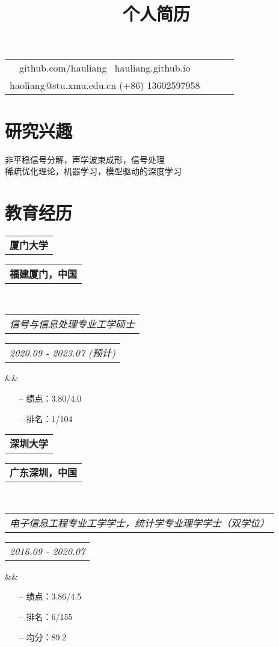 \documentclass[11pt,a4paper,roman]{moderncv}        %
\title{个人简历}
\makeatletter
\newcommand*{\customcventry}[7][.25em]{
	\begin{tabular}{@{}l} 
		{\bfseries #4}
	\end{tabular}
	\hfill%
	\begin{tabular}{l@{}}
		{\bfseries #5}
	\end{tabular} \\
	\begin{tabular}{@{}l} 
		{\itshape #3}
	\end{tabular}
	\hfill%
	\begin{tabular}{l@{}}
		{\itshape #2}
	\end{tabular}
	\ifx&#7&%
	\else{\\%
		\begin{minipage}{\maincolumnwidth}%
			\small#7%
	\end{minipage}}\fi%
	\par\addvspace{#1}}
\makeatother
\begin{document}
	\makecvtitle
	\vspace*{-16mm}
	
	\begin{center}
		\renewcommand{\arraystretch}{1.3}
		\begin{tabular}{ c c c c }
			\faGithub\enspace github.com/hauliang \  \enspace \faGlobe\enspace hauliang.github.io  \\
			\faEnvelopeO\enspace haoliang@stu.xmu.edu.cn \enspace  \enspace \faMobile\enspace (+86) 13602597958 \\
		\end{tabular}
	\end{center}
	
	\vspace*{-2.5mm}
	

	\cfoot{\vspace{-2mm}{\color{gray} \rule[-10pt]{14.3cm}{0.05em}} \vspace{2mm}\\ \textcolor{gray}{最后更新时间：2022/08/05}}
	
	\section{研究兴趣}
	非平稳信号分解，声学波束成形，信号处理 \\
	稀疏优化理论，机器学习，模型驱动的深度学习
	
	\section{教育经历}
	{\customcventry{2020.09 - 2023.07 (预计)}{信号与信息处理专业工学硕士 }{厦门大学}{福建厦门，中国}{}{}}
	
	\begin{itemize}
		\item[--] 绩点：3.80/4.0  
		\item[--] 排名：1/104 
	\end{itemize}
	\vspace{2mm}
	
	{\customcventry{2016.09 - 2020.07}{电子信息工程专业工学学士，统计学专业理学学士（双学位）}{深圳大学}{广东深圳，中国}{}{}}
	
	\begin{itemize}
		\item[--] 绩点：3.86/4.5 
		\item[--] 排名：6/155 
		\item[--] 均分：89.2 
	\end{itemize}
\end{document}
